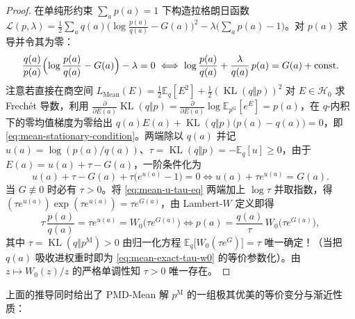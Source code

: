 \documentclass[lang=cn,scheme=chinese,openany]{../book/elegantbook}
\newcommand{\E}{\mathbb E}
\newcommand{\KL}{\operatorname{KL}}
\begin{document}
\begin{proof}
在单纯形约束 $\sum_a p(a)=1$ 下构造拉格朗日函数 $\mathcal L(p,\lambda)=\frac12\sum_a q(a)\bigl(\log\frac{p(a)}{q(a)}-G(a)\bigr)^2-\lambda\bigl(\sum_a p(a)-1\bigr)$。对 $p(a)$ 求导并令其为零：
\begin{equation}
 \frac{q(a)}{p(a)}\Bigl(\log\frac{p(a)}{q(a)}-G(a)\Bigr)-\lambda=0
 \iff
 \log\frac{p(a)}{q(a)}+\frac{\lambda}{q(a)}\,p(a)=G(a)+\text{const}.
\end{equation}
注意若直接在商空间 $L_{\mathrm{Mean}}(E)=\frac12\E_q[E^2]+\frac12(\KL(q\Vert p))^2$ 对 $E\in\mathcal H_0$ 求 Frech\'et 导数，利用 $\frac{\partial}{\partial E(a)}\KL(q\Vert p)=\frac{\partial}{\partial E(a)}\log\E_{p^{\mathrm G}}[e^E]=p(a)$，在 $q$-内积下的零均值梯度为零给出 $q(a)E(a)+\KL(q\Vert p)\bigl(p(a)-q(a)\bigr)=0$，即 \cref{eq:mean-stationary-condition}。两端除以 $q(a)$ 并记 $u(a)=\log(p(a)/q(a))$、$\tau=\KL(q\Vert p)=-\E_q[u]\ge 0$，由于 $E(a)=u(a)+\tau-G(a)$，一阶条件化为
\begin{equation}
 u(a)+\tau-G(a)+\tau\bigl(e^{u(a)}-1\bigr)=0
 \iff
 u(a)+\tau e^{u(a)}=G(a).
 \label{eq:mean-u-tau-eq}
\end{equation}
当 $G\not\equiv 0$ 时必有 $\tau>0$。将 \cref{eq:mean-u-tau-eq} 两端加上 $\log\tau$ 并取指数，得 $(\tau e^{u(a)})\exp(\tau e^{u(a)})=\tau e^{G(a)}$，由 Lambert-$W$ 定义即得
\begin{equation}
 \tau\,\frac{p(a)}{q(a)}=\tau e^{u(a)}=W_0\bigl(\tau e^{G(a)}\bigr)
 \iff
 p(a)=\frac{q(a)}{\tau}\,W_0\bigl(\tau e^{G(a)}\bigr),
 \label{eq:mean-exact-tau-w0}
\end{equation}
其中 $\tau=\KL(q\Vert p^{\mathrm M})>0$ 由归一化方程 $\E_q\bigl[W_0(\tau e^G)\bigr]=\tau$ 唯一确定！（当把 $q(a)$ 吸收进权重时即为 \cref{eq:mean-exact-tau-w0} 的等价参数化）。由 $z\mapsto W_0(z)/z$ 的严格单调性知 $\tau>0$ 唯一存在。
\end{proof}

上面的推导同时给出了 PMD-Mean 解 $p^{\mathrm M}$ 的一组极其优美的等价变分与渐近性质：
\end{document}
